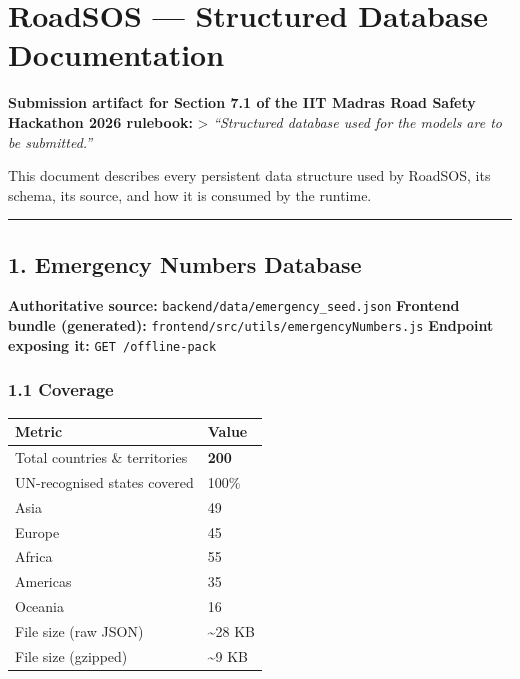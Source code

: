 \hypertarget{roadsos-structured-database-documentation}{%
\section{RoadSOS --- Structured Database
Documentation}\label{roadsos-structured-database-documentation}}

\textbf{Submission artifact for Section 7.1 of the IIT Madras Road
Safety Hackathon 2026 rulebook:} \textgreater{} \emph{``Structured
database used for the models are to be submitted.''}

This document describes every persistent data structure used by RoadSOS,
its schema, its source, and how it is consumed by the runtime.

\begin{center}\rule{0.5\linewidth}{0.5pt}\end{center}

\hypertarget{emergency-numbers-database}{%
\subsection{1. Emergency Numbers
Database}\label{emergency-numbers-database}}

\textbf{Authoritative source:}
\texttt{backend/data/emergency\_seed.json} \textbf{Frontend bundle
(generated):} \texttt{frontend/src/utils/emergencyNumbers.js}
\textbf{Endpoint exposing it:} \texttt{GET\ /offline-pack}

\hypertarget{coverage}{%
\subsubsection{1.1 Coverage}\label{coverage}}

\begin{longtable}[]{@{}ll@{}}
\toprule\noalign{}
Metric & Value \\
\midrule\noalign{}
\endhead
\bottomrule\noalign{}
\endlastfoot
Total countries \& territories & \textbf{200} \\
UN-recognised states covered & 100\% \\
Asia & 49 \\
Europe & 45 \\
Africa & 55 \\
Americas & 35 \\
Oceania & 16 \\
File size (raw JSON) & \textasciitilde28 KB \\
File size (gzipped) & \textasciitilde9 KB \\
\end{longtable}

